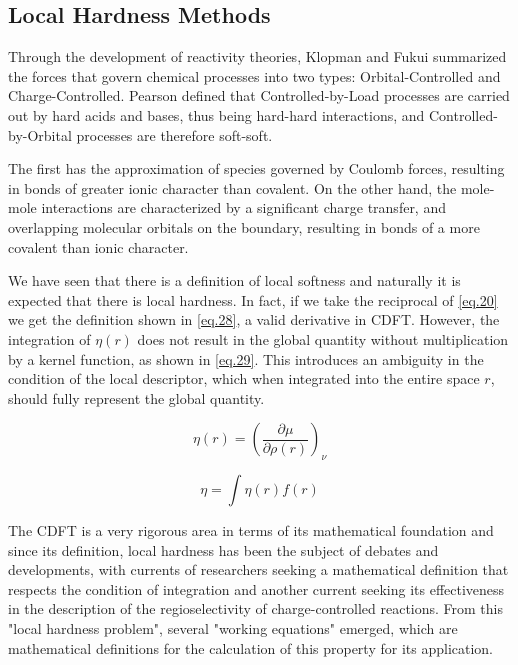 \documentclass[a4paper,11pt]{refart}
\begin{document}
	\subsection{Local Hardness Methods}

	Through the development of reactivity theories, Klopman and Fukui summarized the forces that govern chemical processes into two types: Orbital-Controlled and Charge-Controlled\cite{klopman1968,fukui1970theory}. Pearson defined that Controlled-by-Load processes are carried out by hard acids and bases, thus being hard-hard interactions, and Controlled-by-Orbital processes are therefore soft-soft\cite{Pearson1990}.

	The first has the approximation of species governed by Coulomb forces, resulting in bonds of greater ionic character than covalent. On the other hand, the mole-mole interactions are characterized by a significant charge transfer, and overlapping molecular orbitals on the boundary, resulting in bonds of a more covalent than ionic character.

	We have seen that there is a definition of local softness and naturally it is expected that there is local hardness. In fact, if we take the reciprocal of \autoref{eq.20} we get the definition shown in \autoref{eq.28}, a valid derivative in CDFT. However, the integration of $\eta(r)$ does not result in the global quantity without multiplication by a kernel function, as shown in \autoref{eq.29}. This introduces an ambiguity in the condition of the local descriptor, which when integrated into the entire space $r$, should fully represent the global quantity.

	\begin{equation}
	\eta(r) = \left( \frac{\partial \mu}{\partial \rho(r) } \right)_\nu
	\label{eq.28}
	\end{equation}

	\begin{equation}
	\eta = \int \eta(r) f(r)
	\label{eq.29}
	\end{equation}

	The CDFT is a very rigorous area in terms of its mathematical foundation and since its definition, local hardness has been the subject of debates and developments, with currents of researchers seeking a mathematical definition that respects the condition of integration and another current seeking its effectiveness in the description of the regioselectivity of charge-controlled reactions. From this "local hardness problem", several "working equations" emerged, which are mathematical definitions for the calculation of this property for its application.
\end{document}

